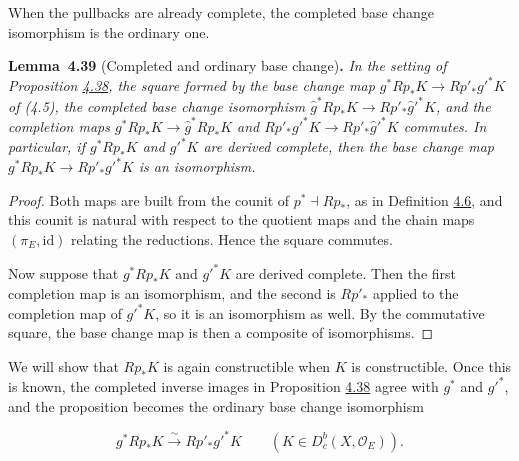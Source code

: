 \documentclass[11pt]{article}
\newenvironment{bpstatement}[2]{\par\addvspace{0.6\baselineskip}\noindent\textbf{#1}#2\textbf{.}\enspace\ignorespaces}
  {\par\addvspace{0.4\baselineskip}}
\newenvironment{bpstatementit}[2]{\begin{bpstatement}{#1}{#2}\itshape\ignorespaces}{\end{bpstatement}}
\providecommand{\Dbc}{}\renewcommand{\Dbc}{D^b_c}
\begin{document}
\label{bp115}%
When the pullbacks are already complete, the completed base change isomorphism is the ordinary one.

\label{bp116}%
\begin{bpstatementit}{Lemma~4.39}{ (Completed and ordinary base change)}
In the setting of Proposition \hyperref[bp113]{4.38}, the square formed by the base change map \(g^*Rp_*K\to Rp'_*g'^*K\) of (4.5), the completed base change isomorphism \(\hat g^*Rp_*K\to Rp'_*\hat g'^*K\), and the completion maps \(g^*Rp_*K\to\hat g^*Rp_*K\) and \(Rp'_*g'^*K\to Rp'_*\hat g'^*K\) commutes. In particular, if \(g^*Rp_*K\) and \(g'^*K\) are derived complete, then the base change map \(g^*Rp_*K\to Rp'_*g'^*K\) is an isomorphism.
\end{bpstatementit}

\begin{proof}[{Proof}]\label{bp117}%
Both maps are built from the counit of \(p^*\dashv Rp_*\), as in Definition \hyperref[bp18]{4.6}, and this counit is natural with respect to the quotient maps and the chain maps \((\pi_E,\mathrm{id})\) relating the reductions. Hence the square commutes.

Now suppose that \(g^*Rp_*K\) and \(g'^*K\) are derived complete. Then the first completion map is an isomorphism, and the second is \(Rp'_*\) applied to the completion map of \(g'^*K\), so it is an isomorphism as well. By the commutative square, the base change map is then a composite of isomorphisms.
\end{proof}

\label{bp118}%
We will show that \(Rp_*K\) is again constructible when \(K\) is constructible. Once this is known, the completed inverse images in Proposition \hyperref[bp113]{4.38} agree with \(g^*\) and \(g'^*\), and the proposition becomes the ordinary base change isomorphism

\[
g^*Rp_*K\xrightarrow{\sim}Rp'_*g'^*K
\qquad(K\in\Dbc(X,\mathcal O_E)).
\]


\end{document}
